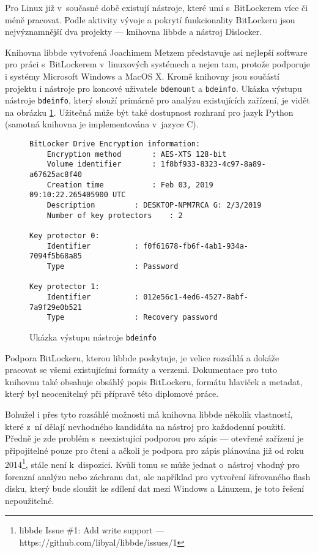 
Pro Linux již v~současné době existují nástroje, které umí s~BitLockerem více či méně pracovat. Podle aktivity vývoje a pokrytí funkcionality BitLockeru jsou nejvýznamnější dva projekty --- knihovna libbde\cite{Metz2018} a nástroj Dislocker\cite{Coltel2017}.


Knihovna libbde vytvořená Joachimem Metzem představuje asi nejlepší software pro práci s~BitLockerem v~linuxových systémech a nejen tam, protože podporuje i systémy Microsoft Windows a MacOS X\cite{Metz2016}. Kromě knihovny jsou součástí projektu i nástroje pro koncové uživatele \texttt{bdemount} a \texttt{bdeinfo}. Ukázka výstupu nástroje \texttt{bdeinfo}, který slouží primárně pro analýzu existujících zařízení, je vidět na obrázku \ref{fig:libbde-bdeinfo}. Užitečná může být také dostupnost rozhraní pro jazyk Python (samotná knihovna je implementována v~jazyce C).

\begin{figure}[h]
		\centering
		\captionsetup{width=0.65\linewidth}
\begin{lstlisting}[frame=none, basicstyle=\ttfamily\small, columns=fullflexible, keepspaces=true]
BitLocker Drive Encryption information:
	Encryption method		: AES-XTS 128-bit
	Volume identifier		: 1f8bf933-8323-4c97-8a89-a67625ac8f40
	Creation time			: Feb 03, 2019 09:10:22.265405900 UTC
	Description			: DESKTOP-NPM7RCA G: 2/3/2019
	Number of key protectors	: 2

Key protector 0:
	Identifier			: f0f61678-fb6f-4ab1-934a-7094f5b68a85
	Type				: Password

Key protector 1:
	Identifier			: 012e56c1-4ed6-4527-8abf-7a9f29e0b521
	Type				: Recovery password
\end{lstlisting}
		\caption{Ukázka výstupu nástroje \texttt{bdeinfo}}
		\label{fig:libbde-bdeinfo}
\end{figure}

Podpora BitLockeru, kterou libbde poskytuje, je velice rozsáhlá a dokáže pracovat se všemi existujícími formáty a verzemi. Dokumentace pro tuto knihovnu také obsahuje obsáhlý popis BitLockeru, formátu hlaviček a metadat\cite{Metz2011}, který byl neocenitelný při přípravě této diplomové práce.

Bohužel i přes tyto rozsáhlé možnosti má knihovna libbde několik vlastností, které z~ní dělají nevhodného kandidáta na nástroj pro každodenní použití. Předně je zde problém s~neexistující podporou pro zápis --- otevřené zařízení je připojitelné pouze pro čtení a ačkoli je podpora pro zápis plánována již od roku 2014\footnote{libbde Issue \#1: Add write support --- https://github.com/libyal/libbde/issues/1}, stále není k~dispozici. Kvůli tomu se může jednat o~nástroj vhodný pro forenzní analýzu nebo záchranu dat, ale například pro vytvoření šifrovaného flash disku, který bude sloužit ke sdílení dat mezi Windows a Linuxem, je toto řešení nepoužitelné.

